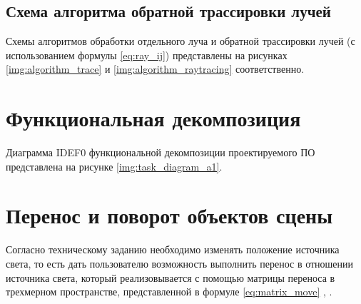 


\clearpage

\subsection{Схема алгоритма обратной трассировки лучей}

Схемы алгоритмов обработки отдельного луча и обратной трассировки лучей (с использованием формулы \ref{eq:ray_ij}) представлены на рисунках \ref{img:algorithm_trace} и \ref{img:algorithm_raytracing} соответственно.



\clearpage

\section{Функциональная декомпозиция}

Диаграмма IDEF0 функциональной декомпозиции проектируемого ПО представлена на рисунке \ref{img:task_diagram_a1}.


\section{Перенос и поворот объектов сцены}

Согласно техническому заданию необходимо изменять положение источника света, то есть дать пользователю возможность выполнить перенос в отношении источника света, который реализовывается с помощью матрицы переноса в трехмерном пространстве, представленной в формуле \ref{eq:matrix_move} \cite{куров}, \cite{боресков}.

